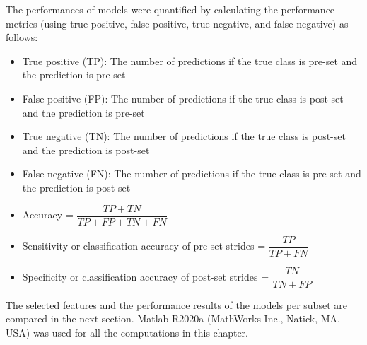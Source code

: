 The performances of models were quantified by calculating the performance metrics (using true positive, false positive, true negative, and false negative) as follows: 

\begin{itemize}
  \item True positive (TP): The number of predictions if the true class is pre-\gls{set} and the prediction is pre-\gls{set}
    
  \item False positive (FP): The number of predictions if the true class is post-\gls{set} and the prediction is pre-\gls{set}
  
    \item True negative (TN): The number of predictions if the true class is post-\gls{set} and the prediction is post-\gls{set}
  
      \item False negative (FN): The number of predictions if the true class is pre-\gls{set} and the prediction is post-\gls{set}
  
      \item Accuracy = $\dfrac{TP + TN}{TP + FP + TN + FN}$
  
      \item Sensitivity or classification accuracy of pre-\gls{set} strides = $\dfrac{TP}{TP + FN}$
  
      \item Specificity or classification accuracy of post-\gls{set} strides = $\dfrac{TN}{TN + FP}$
  \end{itemize}


 The selected features and the performance results of the models per subset are compared in the next section. Matlab R2020a (MathWorks Inc., Natick, MA, USA) was used for all the computations in this chapter. 